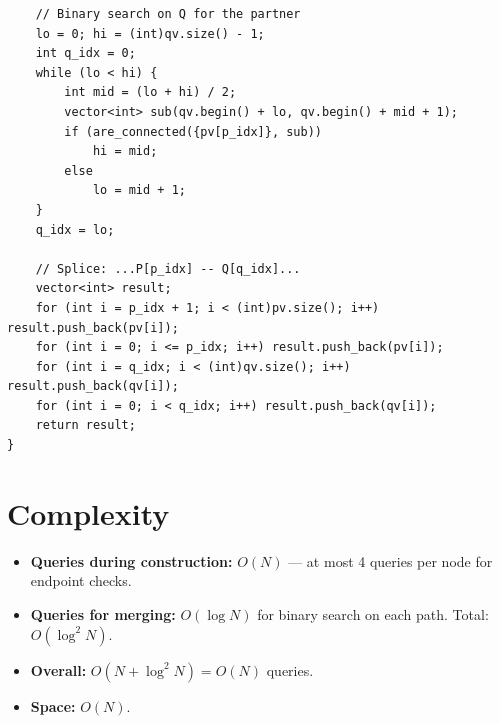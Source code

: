 \documentclass[11pt,a4paper]{article}
\begin{document}
\begin{lstlisting}
    // Binary search on Q for the partner
    lo = 0; hi = (int)qv.size() - 1;
    int q_idx = 0;
    while (lo < hi) {
        int mid = (lo + hi) / 2;
        vector<int> sub(qv.begin() + lo, qv.begin() + mid + 1);
        if (are_connected({pv[p_idx]}, sub))
            hi = mid;
        else
            lo = mid + 1;
    }
    q_idx = lo;

    // Splice: ...P[p_idx] -- Q[q_idx]...
    vector<int> result;
    for (int i = p_idx + 1; i < (int)pv.size(); i++) result.push_back(pv[i]);
    for (int i = 0; i <= p_idx; i++) result.push_back(pv[i]);
    for (int i = q_idx; i < (int)qv.size(); i++) result.push_back(qv[i]);
    for (int i = 0; i < q_idx; i++) result.push_back(qv[i]);
    return result;
}
\end{lstlisting}

\section{Complexity}

\begin{itemize}
  \item \textbf{Queries during construction:} $O(N)$ --- at most 4 queries
        per node for endpoint checks.
  \item \textbf{Queries for merging:} $O(\log N)$ for binary search on each
        path.  Total: $O(\log^2 N)$.
  \item \textbf{Overall:} $O(N + \log^2 N) = O(N)$ queries.
  \item \textbf{Space:} $O(N)$.
\end{itemize}
\end{document}
